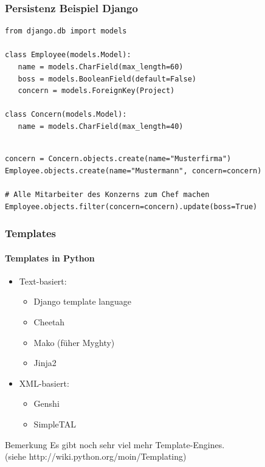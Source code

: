 \documentclass[
    t,
    smaller,
    compress,
]{beamer}
\begin{document}
\begin{frame}[fragile]
  \frametitle{Persistenz Beispiel Django}
  
\begin{lstlisting}
from django.db import models
    
class Employee(models.Model):
   name = models.CharField(max_length=60)
   boss = models.BooleanField(default=False)
   concern = models.ForeignKey(Project)

class Concern(models.Model):   
   name = models.CharField(max_length=40)
\end{lstlisting}
  
\begin{lstlisting}

concern = Concern.objects.create(name="Musterfirma")
Employee.objects.create(name="Mustermann", concern=concern)
	
# Alle Mitarbeiter des Konzerns zum Chef machen
Employee.objects.filter(concern=concern).update(boss=True) 
\end{lstlisting}
  
  
\end{frame}



\begin{frame}
  \frametitle{Templates}
  \framesubtitle{Templates in Python}
  \begin{itemize}[<1->]
  	\item Text-basiert:
        \begin{itemize}[<1->]
            \item Django template language
            \item Cheetah 
            \item Mako (füher Myghty)
            \item Jinja2
        \end{itemize}
    \item XML-basiert:
    	\begin{itemize}[<1->]
    		\item Genshi
            \item SimpleTAL
        \end{itemize}
  \end{itemize}
  \begin{block}{Bemerkung}
    Es gibt noch sehr viel mehr Template-Engines. \\
    (siehe http://wiki.python.org/moin/Templating)
  \end{block}
\end{frame}
\end{document}
